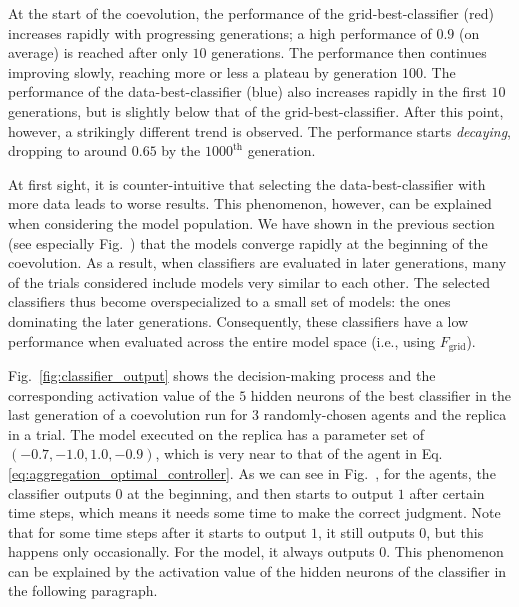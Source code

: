 At the start of the coevolution, the performance of the grid-best-classifier (red) increases rapidly with progressing generations; a high performance of $0.9$ (on average) is reached after only $10$ generations. The performance then continues improving slowly, reaching more or less a plateau by generation $100$.
The performance of the data-best-classifier (blue) also increases rapidly in the first $10$ generations, but is slightly below that of the grid-best-classifier. After this point, however, a strikingly different trend is observed. The performance starts \emph{decaying}, dropping to around $0.65$ by the $1000^\textrm{th}$ generation.

At first sight, it is counter-intuitive that selecting the data-best-classifier with more data leads to worse results. This phenomenon, however, can be explained when considering the model population. We have shown in the previous section (see especially Fig.~) that the models converge rapidly at the beginning of the coevolution. As a result, when classifiers are evaluated in later generations, many of the trials considered include models very similar to each other. The selected classifiers thus become overspecialized to a small set of models: the ones dominating the later generations. Consequently, these classifiers have a low performance when evaluated across the entire model space (i.e., using $F_\textrm{grid}$).

Fig.~\ref{fig:classifier_output} shows the decision-making process and the corresponding activation value of the $5$ hidden neurons of the best classifier in the last generation of a coevolution run for $3$ randomly-chosen agents and the replica in a trial. The model executed on the replica has a parameter set of $(-0.7, -1.0, 1.0, -0.9)$, which is very near to that of the agent in Eq.\eqref{eq:aggregation_optimal_controller}. As we can see in Fig.~, for the agents, the classifier outputs $0$ at the beginning, and then starts to output $1$ after certain time steps, which means it needs some time to make the correct judgment. Note that for some time steps after it starts to output $1$, it still outputs $0$, but this happens only occasionally. For the model, it always outputs $0$.  This phenomenon can be explained by the activation value of the hidden neurons of the classifier in the following paragraph.

